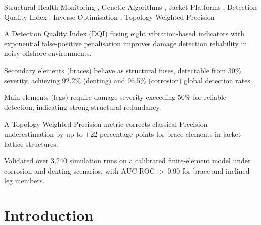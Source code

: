 \documentclass[a4paper,fleqn,nologo]{cas-dc}
\begin{document}
\begin{keywords}
  Structural Health Monitoring \sep
  Genetic Algorithms \sep
  Jacket Platforms \sep
  Detection Quality Index \sep
  Inverse Optimisation \sep
  Topology-Weighted Precision
\end{keywords}

\begin{highlights}
\item A Detection Quality Index (DQI) fusing eight vibration-based indicators with exponential false-positive penalisation improves damage detection reliability in noisy offshore environments.
\item Secondary elements (braces) behave as structural fuses, detectable from 30\% severity, achieving 92.2\% (denting) and 96.5\% (corrosion) global detection rates.
\item Main elements (legs) require damage severity exceeding 50\% for reliable detection, indicating strong structural redundancy.
\item A Topology-Weighted Precision metric corrects classical Precision underestimation by up to $+$22 percentage points for brace elements in jacket lattice structures.
\item Validated over 3{,}240 simulation runs on a calibrated finite-element model under corrosion and denting scenarios, with AUC-ROC $>$\,0.90 for brace and inclined-leg members.
\end{highlights}

\maketitle


\section{Introduction}
\end{document}
